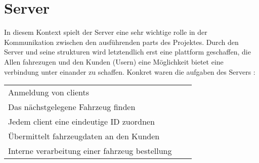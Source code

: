 \documentclass[conference]{IEEEtran}
\begin{document}
\section{Server}
In diesem Kontext spielt der Server eine sehr wichtige rolle in der Kommunikation zwischen den ausführenden parts des Projektes. Durch den Server und seine strukturen wird letztendlich erst eine plattform geschaffen, die Allen fahrezugen und den Kunden (Usern) eine Möglichkeit bietet eine verbindung  unter einander zu schaffen. Konkret waren die aufgaben des Servers : 
\begin{table}[h]
\begin{tabular}{lcr}
Anmeldung von clients\\
Das nächstgelegene Fahrzeug finden\\
Jedem client eine eindeutige ID zuordnen \\
Übermittelt fahrzeugdaten an den Kunden\\
Interne verarbeitung einer fahrzeug bestellung\\

\end{tabular}
\end{table}

\begin{thebibliography}{00}
\end{thebibliography}
\vspace{12pt}
\end{document}
